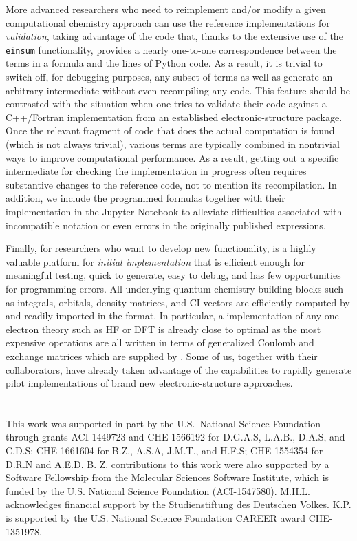More advanced researchers who need to reimplement and/or modify a given computational chemistry approach can use the \pfn reference implementations for \emph{validation}, taking advantage of the code that, thanks to the extensive use of the \numpy \texttt{einsum} functionality, provides a nearly one-to-one correspondence between the terms in a formula and the lines of Python code. As a result, it is trivial to switch off, for debugging purposes, any subset of terms as well as generate an arbitrary intermediate without even recompiling any code.  This feature should be contrasted with the situation when one tries to validate their code against a C++/Fortran implementation from an established electronic-structure package. Once the relevant fragment of code that does the actual computation is found (which is not always trivial), various terms are typically combined in nontrivial ways to improve computational performance. As a result, getting out a specific intermediate for checking the implementation in progress often requires substantive changes to the reference code, not to mention its recompilation.  In addition, we include the programmed formulas together with their implementation in the Jupyter Notebook to alleviate difficulties associated with incompatible notation or even errors in the originally published expressions.

Finally, for researchers who want to develop new functionality, \pfn is a highly valuable platform for \emph{initial implementation} that is efficient enough for meaningful testing, quick to generate, easy to debug, and has few opportunities for programming errors. All underlying quantum-chemistry building blocks such as integrals, orbitals, density matrices, and CI vectors are efficiently computed by \pfour and readily imported in the \numpy format. In particular, a \pfn implementation of any one-electron theory such as HF or DFT is already close to optimal as the most expensive operations are all written in terms of generalized Coulomb and exchange matrices which are supplied by \pfour.  Some of us, together with their collaborators, have already taken advantage of the \pfn capabilities to rapidly generate pilot implementations of brand new electronic-structure approaches.

\section{\texorpdfstring{}{Acknowledgements}}

This work was supported in part by the U.S.~National Science Foundation through grants ACI-1449723 and CHE-1566192 for D.G.A.S, L.A.B., D.A.S, and C.D.S; CHE-1661604 for B.Z., A.S.A, J.M.T., and H.F.S; CHE-1554354 for D.R.N and A.E.D. B. Z. contributions to this work were also supported by a Software Fellowship from the Molecular Sciences Software Institute, which is funded by the U.S. National Science Foundation (ACI-1547580). M.H.L. acknowledges financial support by the Studienstiftung des Deutschen Volkes. K.P. is supported by the U.S. National Science Foundation CAREER award CHE-1351978.

